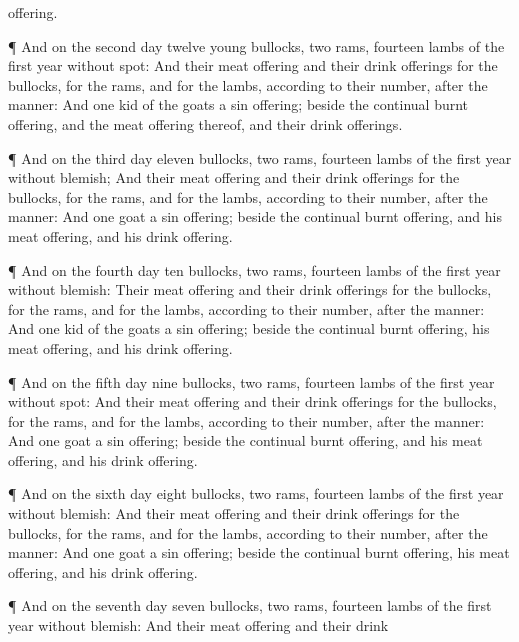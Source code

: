 {offering.
\par }{\PP {}¶ And on the
second
day
{}
twelve
young
bullocks,
two
rams,
fourteen
lambs of the
first
year without
spot:
And their meat
offering and their drink
offerings for the
bullocks, for the
rams, and for the
lambs,
{} according to their
number, after the
manner:
And
one
kid of the
goats
{} a sin
offering; beside the
continual burnt
offering, and the meat
offering thereof, and their drink
offerings.
\par }{\PP {}¶ And on the
third
day
eleven
bullocks,
two
rams,
fourteen
lambs of the
first
year without
blemish;
And their meat
offering and their drink
offerings for the
bullocks, for the
rams, and for the
lambs,
{} according to their
number, after the
manner:
And
one
goat
{} a sin
offering; beside the
continual burnt
offering, and his meat
offering, and his drink
offering.
\par }{\PP {}¶ And on the
fourth
day
ten
bullocks,
two
rams,
{}
fourteen
lambs of the
first
year without
blemish:
Their meat
offering and their drink
offerings for the
bullocks, for the
rams, and for the
lambs,
{} according to their
number, after the
manner:
And
one
kid of the
goats
{} a sin
offering; beside the
continual burnt
offering, his meat
offering, and his drink
offering.
\par }{\PP {}¶ And on the
fifth
day
nine
bullocks,
two
rams,
{}
fourteen
lambs of the
first
year without
spot:
And their meat
offering and their drink
offerings for the
bullocks, for the
rams, and for the
lambs,
{} according to their
number, after the
manner:
And
one
goat
{} a sin
offering; beside the
continual burnt
offering, and his meat
offering, and his drink
offering.
\par }{\PP {}¶ And on the
sixth
day
eight
bullocks,
two
rams,
{}
fourteen
lambs of the
first
year without
blemish:
And their meat
offering and their drink
offerings for the
bullocks, for the
rams, and for the
lambs,
{} according to their
number, after the
manner:
And
one
goat
{} a sin
offering; beside the
continual burnt
offering, his meat
offering, and his drink
offering.
\par }{\PP {}¶ And on the
seventh
day
seven
bullocks,
two
rams,
{}
fourteen
lambs of the
first
year without
blemish:
And their meat
offering and their drink
}
